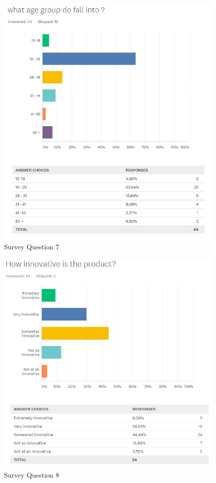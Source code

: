\documentclass[12pt,a4paper]{article}
\begin{document}
\begin{appendices}
        \begin{figure}[H]
          \centering
          \includegraphics[width=1\textwidth]{assets/12-2-survey-7.jpg}
          \caption{Survey Question 7}
          \label{fig:Survey Question 7}
        \end{figure}

        \begin{figure}[H]
          \centering
          \includegraphics[width=1\textwidth]{assets/12-2-survey-8.jpg}
          \caption{Survey Question 8}
          \label{fig:Survey Question 8}
        \end{figure}


\end{appendices}
\end{document}
